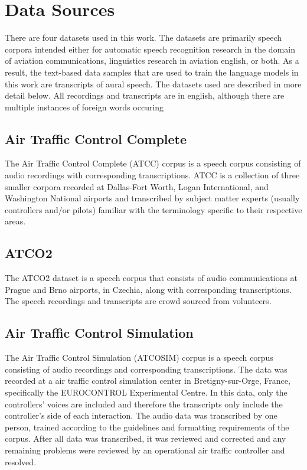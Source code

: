 \documentclass[12pt]{article}
\begin{document}
\section{Data Sources}\label{sec:data_source}
There are four datasets used in this work. The datasets are primarily speech corpora intended either for automatic speech recognition
research in the domain of aviation communications, linguistics research in aviation english, or both. As a result, the text-based data
samples that are used to train the language models in this work are transcripts of aural speech. The datasets used are described in more
detail below. All recordings and transcripts are in english, although there are multiple instances of foreign words occuring

\subsection{Air Traffic Control Complete}\label{sec:atcc}
The Air Traffic Control Complete (ATCC) corpus is a speech corpus consisting of audio recordings with corresponding transcriptions.
ATCC is a collection of three smaller corpora recorded at Dallas-Fort Worth, Logan International, and Washington National airports and
transcribed by subject matter experts (usually controllers and/or pilots) familiar with the terminology specific to their respective
areas\cite{godfrey_air_1994}.

\subsection{ATCO2}\label{sec:atco2}
The ATCO2 dataset is a speech corpus that consists of audio communications at Prague and Brno airports, in Czechia, along with corresponding
transcriptions. The speech recordings and transcripts are crowd sourced from volunteers\cite{szoke_detecting_2021}.


\subsection{Air Traffic Control Simulation}\label{sec:atcosim}
The Air Traffic Control Simulation (ATCOSIM) corpus is a speech corpus consisting of audio recordings and corresponding transcriptions.
The data was recorded at a air traffic control simulation center in Bretigny-sur-Orge, France, specifically the EUROCONTROL Experimental Centre.
In this data, only the controllers' voices are included and therefore the transcripts only include the controller's side of each interaction.
The audio data was transcribed by one person, trained according to the guidelines and formatting requirements of the corpus. After all data was
transcribed, it was reviewed and corrected and any remaining problems were reviewed by an operational air traffic controller and
resolved\cite{hofbauer_atcosim_2008}.
\end{document}

